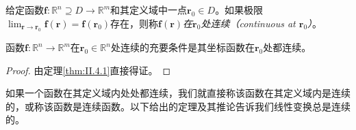 \documentclass[main.tex]{subfiles}
\begin{document}
\begin{definition}[函数的连续性]\label{def:II.4.6}
    给定函数$\mathbf{f}:\mathbb{R}^n\supseteq D\rightarrow\mathbb{R}^m$和其定义域中一点$\mathbf{r}_0\in D$。如果极限$\lim_{\mathbf{r}\to\mathbf{r}_0}\mathbf{f}\left(\mathbf{r}\right)=\mathbf{f}\left(\mathbf{r}_0\right)$存在，则称$\mathbf{f}\left(\mathbf{r}\right)$\emph{在$\mathbf{r}_0$处连续（continuous at $\mathbf{r}_0$）}。
\end{definition}

\begin{theorem}\label{thm:II.4.2}
    函数$\mathbf{f}:\mathbb{R}^n\rightarrow\mathbb{R}^m$在$\mathbf{r}_0\in\mathbb{R}^n$处连续的充要条件是其坐标函数在$\mathbf{r}_0$处都连续。
\end{theorem}
\begin{proof}
    由定理\ref{thm:II.4.1}直接得证。
\end{proof}

如果一个函数在其定义域内处处都连续，我们就直接称该函数在其定义域内是连续的，或称该函数是连续函数。以下给出的定理及其推论告诉我们线性变换总是连续的。
\end{document}
